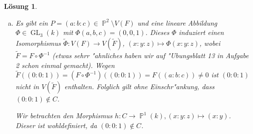 \documentclass[a4paper, 12pt, numbers=noendperiod, chapterprefix=true]{scrbook}
\theoremstyle{break}
\newtheorem{Loes}{L\"osung}
\theoremstyle{nonumberbreak}
\theoremstyle{nonumberplain}
\DeclareMathOperator{\GL}{GL}
\DeclareMathOperator{\Divisor}{div}
\DeclareMathOperator{\ord}{ord}
\newcommand{\A}{\mathbb{A}}
\DeclareMathOperator{\Projective}{\mathbb{P}} %
\newcommand{\calO}{\mathcal{O}}
\begin{document}
\begin{Loes}
\begin{enumerate}[a)]
	Nun k"onnen wir die Schnittdivisoren berechnen: 

	Zun"achst stellen wir fest, dass $\ord_{(a:b:c)}(\frac{X}{H}) = 0$ für $a \neq 0$. Aus $(0:b:c) \in C$ folgt $b=0$ oder $c=0$. Somit gilt
		\[\Divisor(X) = \ord_{(0:0:1)}(\frac{X}{Z}) \cdot (0:0:1) + \ord_{(0:1:0)}(\frac{X}{Y}) \cdot (0:1:0) = 2 \cdot (0:0:1) + 1 \cdot (0:1:0)\; .\]
	Analog folgt
		\[\Divisor(Y) = 1 \cdot (0:0:1) +  1 \cdot (1:0:1) +  1 \cdot (-1:0:1) \quad \textrm{und} \quad
		\Divisor(Z) = 3 \cdot (0:1:0)\;.\]
 	Die geometrische Bedeutung des Schnittdivisors ist genau das, was der Name suggeriert. Schneidet man $C$ mit $V(G)$ und z"ahlt die Schnittpunkte mit Vielfachheit, so bekommt man den Schnittdivisor $\Divisor(G)$. Die Abbildungen 1 und 2 zeigen zwei reelle Bilder zur geometrischen Bedeutung.
	\begin{center}
		\textcolor{red}{[BILD]}\\
		Abbildung 1: $C \cap D(Z)$ mit $V(X)$ ($y$-Achse) und $V(Y)$ ($x$-Achse).

		\textcolor{red}{[BILD]}\\
		Abbildung 2: $C\cap D(Y)$ mit $V(Z)$ ($x$-Achse).
	\end{center}
\item
	Es gibt ein $P =(a:b:c)\in \Projective^2\setminus V(F)$ und eine lineare Abbildung $\Phi \in \GL_3(k)$ mit $\Phi(a,b,c) = (0,0,1)$. Dieses $\Phi$ induziert einen Isomorphismus $\tilde{\Phi} \colon V(F) \to V(\tilde{F})$, $(x:y:z) \mapsto \Phi(x:y:z)$, wobei $\tilde{F} = F \circ \Phi^{-1}$ (etwas sehrr "ahnliches haben wir auf "Ubungsblatt 13 in Aufgabe 2 schon einmal gemacht). Wegen $\tilde{F}((0:0:1)) = (F \circ \Phi^{-1})((0:0:1)) = F((a:b:c)) \neq 0$ ist $(0:0:1)$ nicht in $V(\tilde{F})$ enthalten. Folglich gilt ohne Einschr"ankung, dass $(0:0:1) \notin C$.

	Wir betrachten den Morphismus $h: C \to \Projective^1(k), (x:y:z) \mapsto(x:y)$. Dieser ist wohldefiniert, da $(0:0:1) \notin C$.


\end{enumerate}
\end{Loes}
\end{document}
